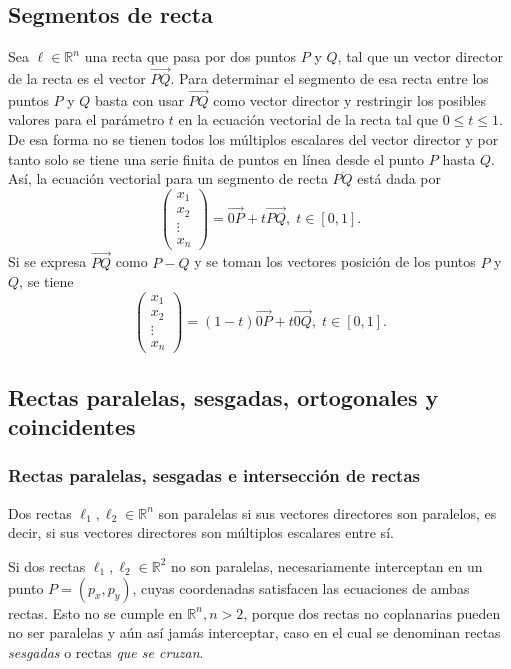 \documentclass{fmbnotes}
\begin{document}
\subsection{Segmentos de recta}
Sea \(\ell \in \mathbb{R}^{n}\) una recta que pasa por dos puntos \(P\) y \(Q\), tal que un vector director de la recta es el vector \(\overrightarrow{PQ}\). Para determinar el segmento de esa recta entre los puntos \(P\) y \(Q\) basta con usar \(\overrightarrow{PQ}\) como vector director y restringir los posibles valores para el parámetro \(t\) en la ecuación vectorial de la recta tal que \(0 \leq t \leq 1\). De esa forma no se tienen todos los múltiplos escalares del vector director y por tanto solo se tiene una serie finita de puntos en línea desde el punto \(P\) hasta \(Q\). Así, la ecuación vectorial para un segmento de recta \(\overline{PQ}\) está dada por 
\[ \begin{pmatrix}
x_{1} \\
x_{2} \\
\vdots \\
x_{n}
\end{pmatrix}
=\overrightarrow{0P}+t\overrightarrow{PQ}, \; t \in [0,1].\]
Si se expresa \(\overrightarrow{PQ}\) como \(P-Q\) y se toman los vectores posición de los puntos \(P\) y \(Q\), se tiene
\[ \begin{pmatrix}
x_{1} \\
x_{2} \\
\vdots \\
x_{n}
\end{pmatrix}
=(1-t)\overrightarrow{0P}+t\overrightarrow{0Q}, \; t \in [0,1].\]

\subsection{Rectas paralelas, sesgadas, ortogonales y coincidentes}
\subsubsection{Rectas paralelas, sesgadas e intersección de rectas}
Dos rectas \( \ell_{1}, \ell_{2} \in \mathbb{R}^{n} \) son paralelas si sus vectores directores son paralelos, es decir, si sus vectores directores son múltiplos escalares entre sí.

Si dos rectas \( \ell_{1}, \ell_{2} \in \mathbb{R}^{2} \) no son paralelas, necesariamente interceptan en un punto \( P=\left(p_{x}, p_{y}\right) \), cuyas coordenadas satisfacen las ecuaciones de ambas rectas. Esto no se cumple en \( \mathbb{R}^{n}, n>2 \), porque dos rectas no coplanarias pueden no ser paralelas y aún así jamás interceptar, caso en el cual se denominan rectas \emph{sesgadas} o rectas \emph{que se cruzan}.
\end{document}
